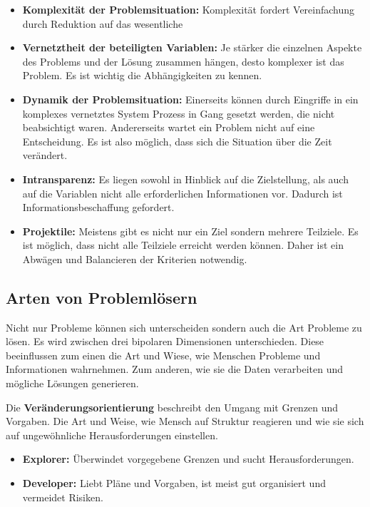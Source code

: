 \begin{itemize}
\item \textbf{Komplexität der Problemsituation:} Komplexität fordert Vereinfachung durch Reduktion auf das wesentliche 
\item \textbf{Vernetztheit der beteiligten Variablen:} Je stärker die einzelnen Aspekte des Problems und der Lösung zusammen hängen, desto komplexer ist das Problem. Es ist wichtig die Abhängigkeiten zu kennen.
\item \textbf{Dynamik der Problemsituation:} Einerseits können durch Eingriffe in ein komplexes vernetztes System Prozess in Gang gesetzt werden, die nicht beabsichtigt waren. Andererseits wartet ein Problem nicht auf eine Entscheidung. Es ist also möglich, dass sich die Situation über die Zeit verändert.
\item \textbf{Intransparenz:} Es liegen sowohl in Hinblick auf die Zielstellung, als auch auf die Variablen nicht alle erforderlichen Informationen vor. Dadurch ist Informationsbeschaffung gefordert.
\item \textbf{Projektile:} Meistens gibt es nicht nur ein Ziel sondern mehrere Teilziele. Es ist möglich, dass nicht alle Teilziele erreicht werden können. Daher ist ein Abwägen und Balancieren der Kriterien notwendig. 
\end{itemize}

\subsection{Arten von Problemlösern}
Nicht nur Probleme können sich unterscheiden sondern auch die Art Probleme zu lösen. Es wird zwischen drei bipolaren Dimensionen unterschieden. \cite{Betsch2011} Diese beeinflussen zum einen die Art und Wiese, wie Menschen Probleme und Informationen wahrnehmen. Zum anderen, wie sie die Daten verarbeiten und mögliche Lösungen generieren.

Die \textbf{Veränderungsorientierung} beschreibt den Umgang mit Grenzen und Vorgaben. Die Art und Weise, wie Mensch auf Struktur reagieren und wie sie sich auf ungewöhnliche Herausforderungen einstellen.
	\begin{itemize}
	\item \textbf{Explorer:} Überwindet vorgegebene Grenzen und sucht Herausforderungen.
	\item \textbf{Developer:} Liebt Pläne und Vorgaben, ist meist gut organisiert und vermeidet Risiken.
	\end{itemize}

